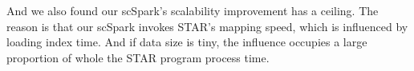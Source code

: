 \documentclass[conference]{IEEEtran}
\begin{document}
  And we also found our scSpark's scalability improvement has a ceiling. 
  The reason is that our scSpark invokes STAR's mapping speed, which is influenced by loading index time. 
  And if data size is tiny, the influence occupies a large proportion of whole the STAR program process time. 










\end{document}
